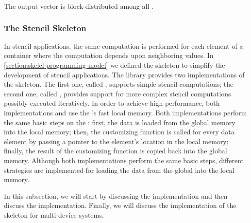 The output vector is block-distributed among all \GPUs.





\subsubsection{The Stencil Skeleton}
\label{sec:skelcl:stencil}
In stencil applications, the same computation is performed for each element of a container where the computation depends upon neighboring values.
In \autoref{section:skelcl-programming-model} we defined the \stencil skeleton to simplify the development of stencil applications.
The \SkelCL library provides two implementations of the \stencil skeleton.
The first one, called , supports simple stencil computations;
the second one, called , provides support for more complex stencil computations possibly executed iteratively.
In order to achieve high performance, both implementations  and  use the \GPU's fast local memory.
Both implementations perform the same basic steps on the \GPU:
first, the data is loaded from the global memory into the local memory;
then, the customizing function is called for every data element by passing a pointer to the element's location in the local memory;
finally, the result of the customizing function is copied back into the global memory.
Although both implementations perform the same basic steps, different strategies are implemented for loading the data from the global into the local memory.

In this subsection, we will start by discussing the  implementation and then discuss the  implementation.
Finally, we will discuss the implementation of the \stencil skeleton for multi-device systems.

